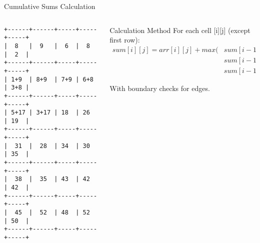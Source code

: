 \documentclass{beamer}
\begin{document}
\begin{frame}{Cumulative Sums Calculation}
    \begin{columns}
        \begin{column}{0.5\textwidth}
            \begin{lstlisting}[basicstyle=\ttfamily\footnotesize]
+------+------+-----+-----+-----+
|  8   |  9   |  6  |  8  |  2  |
+------+------+-----+-----+-----+
| 1+9  | 8+9  | 7+9 | 6+8 | 3+8 |
+------+------+-----+-----+-----+
| 5+17 | 3+17 | 18  | 26  | 19  |
+------+------+-----+-----+-----+
|  31  |  28  | 34  | 30  | 35  |
+------+------+-----+-----+-----+
|  38  |  35  | 43  | 42  | 42  |
+------+------+-----+-----+-----+
|  45  |  52  | 48  | 52  | 50  |
+------+------+-----+-----+-----+
            \end{lstlisting}
        \end{column}
        \begin{column}{0.5\textwidth}
            \begin{block}{Calculation Method}
                For each cell [i][j] (except first row):
                \begin{align*}
                sum[i][j] = arr[i][j] + max(&sum[i-1][j-1], \\
                                        &sum[i-1][j], \\
                                        &sum[i-1][j+1])
                \end{align*}
                
                With boundary checks for edges.
            \end{block}
        \end{column}
    \end{columns}
\end{frame}
\end{document}
